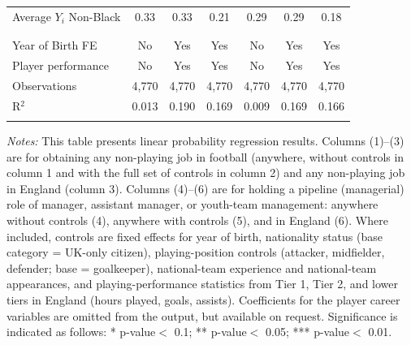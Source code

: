 \begin{table}[!h]
{\begin{threeparttable}
\begin{tabular}{@{\extracolsep{15pt}}lcccccc}
Average $Y_{i}$ Non-Black & 0.33 & 0.33 & 0.21 & 0.29 & 0.29 & 0.18 \\ 
  & & & & & & \\ 
\hline \\[-1.8ex]
Year of Birth FE & No & Yes & Yes & No & Yes & Yes \\
Player performance & No & Yes & Yes & No & Yes & Yes \\
Observations & 4,770 & 4,770 & 4,770 & 4,770 & 4,770 & 4,770 \\
R$^{2}$ & 0.013 & 0.190 & 0.169 & 0.009 & 0.169 & 0.166 \\
\hline
\hline \\[-1.8ex]
\end{tabular}
\begin{tablenotes}[flushleft]
		\item[] \scriptsize \textit{Notes:} This table presents linear probability regression results. Columns (1)--(3) are for obtaining any non-playing job in football (anywhere, without controls in column 1 and with the full set of controls in column 2) and any non-playing job in England (column 3). Columns (4)--(6) are for holding a pipeline (managerial) role of manager, assistant manager, or youth-team management: anywhere without controls (4), anywhere with controls (5), and in England (6). Where included, controls are fixed effects for year of birth, nationality status (base category = UK-only citizen), playing-position controls (attacker, midfielder, defender; base = goalkeeper), national-team experience and national-team appearances, and playing-performance statistics from Tier 1, Tier 2, and lower tiers in England (hours played, goals, assists). Coefficients for the player career variables are omitted from the output, but available on request. Significance is indicated as follows: * p-value$<$ 0.1; ** p-value$<$ 0.05; *** p-value$<$ 0.01.
		\end{tablenotes}
  \end{threeparttable}
  }
\end{table}
